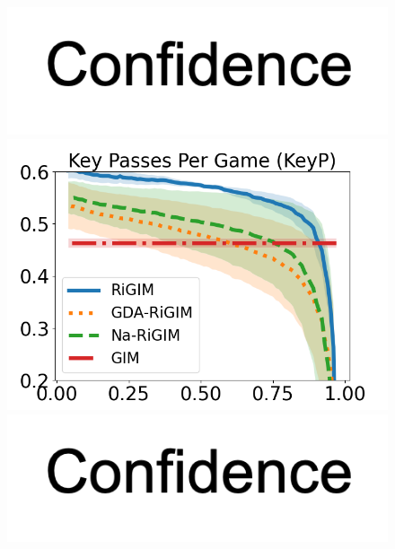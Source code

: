 \documentclass[letterpaper]{article} %
\begin{document}
\begin{figure}[htbp]
\begin{minipage}{0.16\textwidth}
    \vspace{-0.05in}
    \includegraphics[scale=0.12]{figures/confidence_x_label.png}
    \end{minipage}
    \begin{minipage}{0.16\textwidth}
    \centering
    \includegraphics[scale=0.16]{figures/soccer_risk_curve_KeyP_shadow.png}\par
    \vspace{-0.05in}
    \includegraphics[scale=0.12]{figures/confidence_x_label.png}
    \end{minipage}
    \begin{minipage}{0.16\textwidth}
    \centering

\end{minipage}
\end{figure}
\end{document}
